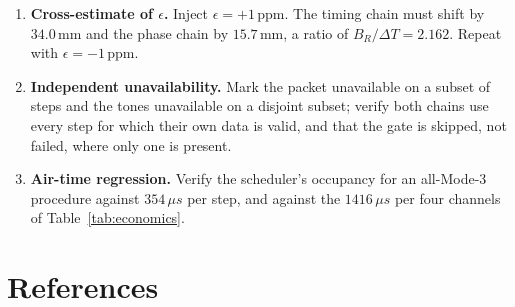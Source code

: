 \documentclass[11pt,a4paper]{article}
\newcommand{\us}{\,\ensuremath{\upmu}s}
\providecommand{\upmu}{\mu}
\begin{document}
\begin{enumerate}[label=\textbf{C\arabic*.},leftmargin=2.6em,itemsep=2pt]
    Section~\ref{sec:verify}, item 8.
  \item \textbf{Cross-estimate of $\epsilon$.} Inject $\epsilon = +1$\,ppm. The timing chain must
    shift by $34.0$\,mm and the phase chain by $15.7$\,mm, a ratio of $B_R/\Delta T = 2.162$. Repeat
    with $\epsilon=-1$\,ppm.
  \item \textbf{Independent unavailability.} Mark the packet unavailable on a subset of steps and the
    tones unavailable on a disjoint subset; verify both chains use every step for which their own
    data is valid, and that the gate is skipped, not failed, where only one is present.
  \item \textbf{Air-time regression.} Verify the scheduler's occupancy for an all-Mode-3 procedure
    against $354\us$ per step, and against the $1416\us$ per four channels of
    Table~\ref{tab:economics}.
\end{enumerate}

\clearpage
\section*{References}
\end{document}
